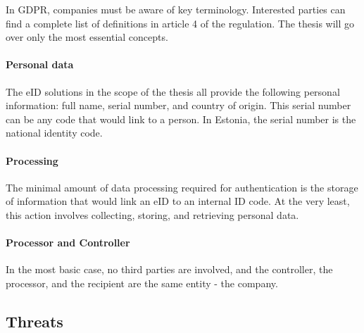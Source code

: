 In GDPR, companies must be aware of key terminology. Interested parties can find a complete list of definitions in article 4 of the regulation. The thesis will go over only the most essential concepts.

\paragraph{Personal data} The eID solutions in the scope of the thesis all provide the following personal information: full name, serial number, and country of origin. This serial number can be any code that would link to a person. In Estonia, the serial number is the national identity code.

\paragraph{Processing} The minimal amount of data processing required for authentication is the storage of information that would link an eID to an internal ID code. At the very least, this action involves collecting, storing, and retrieving personal data.

\paragraph{Processor and Controller} In the most basic case, no third parties are involved, and the controller, the processor, and the recipient are the same entity - the company.

\subsection{Threats}

